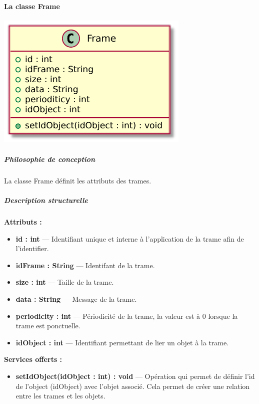 \paragraph{La classe Frame}

\begin{minipage}
    {\linewidth}
    \centering
    \includegraphics[width=0.80\linewidth]{../schemas/Conception_detaillee/classe_frame.pdf}
\end{minipage}

\subparagraph{Philosophie de conception \newline} 

\medspace

La classe Frame définit les attributs des trames. 

\subparagraph{Description structurelle \newline}

\medspace

\textbf{Attributs :}

\begin{itemize}
    \item \textbf{id : int} --- Identifiant unique et interne à l'application de la trame afin de l'identifier. 
    \item \textbf{idFrame : String} --- Identifant de la trame. 
    \item \textbf{size : int} --- Taille de la trame.
    \item \textbf{data : String} --- Message de la trame. 
    \item \textbf{periodicity : int} --- Périodicité de la trame, la valeur est à 0 lorsque la trame est ponctuelle. 
    \item \textbf{idObject : int} --- Identifiant permettant de lier un objet à la trame. 
\end{itemize}


\textbf{Services offerts :}

\begin{itemize}
    \item \textbf{setIdObject(idObject : int) : void} --- Opération qui permet de définir l'id de l'object (idObject) avec l'objet associé. Cela permet de créer une relation entre les trames et les objets.  
\end{itemize}